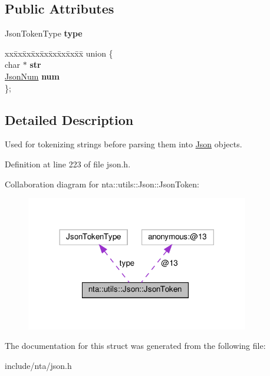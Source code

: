 \subsection*{Public Attributes}
\begin{DoxyCompactItemize}
\item 
\mbox{\label{structnta_1_1utils_1_1Json_1_1JsonToken_ab0bf0cda189a3063f326abcbf57532bb}} 
Json\+Token\+Type {\bfseries type}
\item 
\mbox{\label{structnta_1_1utils_1_1Json_1_1JsonToken_a7123d444ecb1662248a2b54d4f27d087}} 
\begin{tabbing}
xx\=xx\=xx\=xx\=xx\=xx\=xx\=xx\=xx\=\kill
union \{\\
\mbox{\label{structnta_1_1utils_1_1Json_1_1JsonToken_a249048bb34d397d9f9034391f07e8666}} 
char $\ast$ {\bfseries str}\\
\mbox{\label{structnta_1_1utils_1_1Json_1_1JsonToken_a276868d3bfc600a8e9b00a9719d09122}} 
\hyperlink{classnta_1_1utils_1_1JsonNum}{JsonNum} {\bfseries num}\\
\}; \\

\end{tabbing}\end{DoxyCompactItemize}


\subsection{Detailed Description}
Used for tokenizing strings before parsing them into \hyperlink{classnta_1_1utils_1_1Json}{Json} objects. 

Definition at line 223 of file json.\+h.



Collaboration diagram for nta\+:\+:utils\+:\+:Json\+:\+:Json\+Token\+:\nopagebreak
\begin{figure}[H]
\begin{center}
\leavevmode
\includegraphics[width=276pt]{d9/d6a/structnta_1_1utils_1_1Json_1_1JsonToken__coll__graph}
\end{center}
\end{figure}


The documentation for this struct was generated from the following file\+:\begin{DoxyCompactItemize}
\item 
include/nta/json.\+h\end{DoxyCompactItemize}
